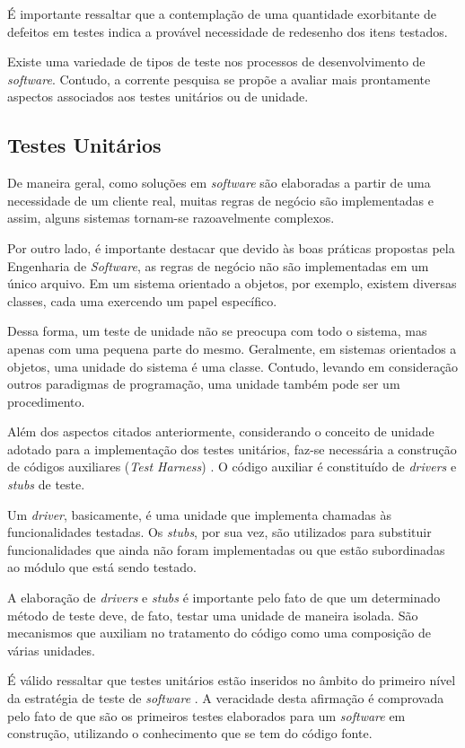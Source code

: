 É importante ressaltar que a contemplação de uma quantidade exorbitante de defeitos em testes indica a provável necessidade de redesenho dos itens testados.

Existe uma variedade de tipos de teste nos processos de desenvolvimento de \textit{software}. Contudo, a corrente pesquisa se propõe a avaliar mais prontamente aspectos associados aos testes unitários ou de unidade.

\subsection{Testes Unitários}

De maneira geral, como soluções em \textit{software} são elaboradas a partir de uma necessidade de um cliente real, muitas regras de negócio são implementadas e assim, alguns sistemas tornam-se razoavelmente complexos.

Por outro lado, é importante destacar que devido às boas práticas propostas pela Engenharia de \textit{Software}, as regras de negócio não são implementadas em um único arquivo. Em um sistema orientado a objetos, por exemplo, existem diversas classes, cada uma exercendo um papel específico.

Dessa forma, um teste de unidade não se preocupa com todo o sistema, mas apenas com uma pequena parte do mesmo. Geralmente, em sistemas orientados a objetos, uma unidade do sistema é uma classe. Contudo, levando em consideração outros paradigmas de programação, uma unidade também pode ser um procedimento.

Além dos aspectos citados anteriormente, considerando o conceito de unidade adotado para a implementação dos testes unitários, faz-se necessária a construção de códigos auxiliares (\textit{Test Harness}) \cite{stubs1}. O código auxiliar é constituído de \textit{drivers} e \textit{stubs} de teste.

Um \textit{driver}, basicamente, é uma unidade que implementa chamadas às funcionalidades testadas. Os \textit{stubs}, por sua vez, são utilizados para substituir funcionalidades que ainda não foram implementadas ou que estão subordinadas ao módulo que está sendo testado.

A elaboração de \textit{drivers} e \textit{stubs} é importante pelo fato de que um determinado método de teste deve, de fato, testar uma unidade de maneira isolada. São mecanismos que auxiliam no tratamento do código como uma composição de várias unidades.

É válido ressaltar que testes unitários estão inseridos no âmbito do primeiro nível da estratégia de teste de \textit{software} \cite{nasa}. A veracidade desta afirmação é comprovada pelo fato de que são os primeiros testes elaborados para um \textit{software} em construção, utilizando o conhecimento que se tem do código fonte.

